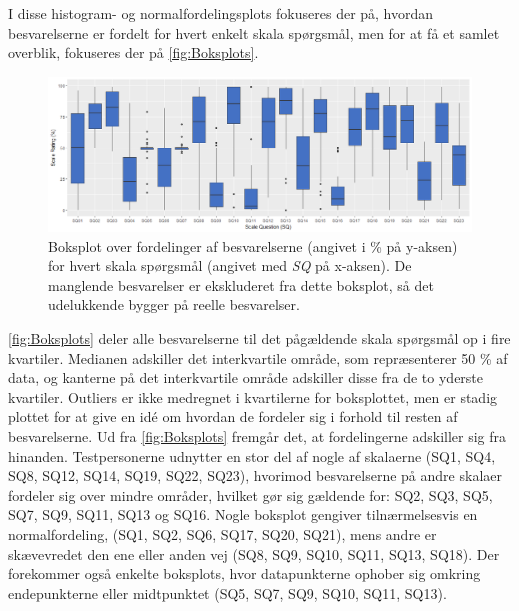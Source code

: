 \noindent
%
I disse histogram- og normalfordelingsplots fokuseres der på, hvordan besvarelserne er fordelt for hvert enkelt skala spørgsmål, men for at få et samlet overblik, fokuseres der på \autoref{fig:Boksplots}. 
%
\begin{figure}[H]
\centering
\includegraphics[width = \textwidth]{Figure/DatabehandlingSkalaer/BoksplotUden0er} 
\caption{Boksplot over fordelinger af besvarelserne (angivet i \% på y-aksen) for hvert skala spørgsmål (angivet med \textit{SQ} på x-aksen). De manglende besvarelser er ekskluderet fra dette boksplot, så det udelukkende bygger på reelle besvarelser.}
\label{fig:Boksplots}
\end{figure}
\noindent
%
\autoref{fig:Boksplots} deler alle besvarelserne til det pågældende skala spørgsmål op i fire kvartiler. Medianen adskiller det interkvartile område, som repræsenterer 50 \% af data, og kanterne på det interkvartile område adskiller disse fra de to yderste kvartiler. Outliers er ikke medregnet i kvartilerne for boksplottet, men er stadig plottet for at give en idé om hvordan de fordeler sig i forhold til resten af besvarelserne. \blankline
%
Ud fra \autoref{fig:Boksplots} fremgår det, at fordelingerne adskiller sig fra hinanden. Testpersonerne udnytter en stor del af nogle af skalaerne (SQ1, SQ4, SQ8, SQ12, SQ14, SQ19, SQ22, SQ23), hvorimod besvarelserne på andre skalaer fordeler sig over mindre områder, hvilket gør sig gældende for: SQ2, SQ3, SQ5, SQ7, SQ9, SQ11, SQ13 og SQ16. Nogle boksplot gengiver tilnærmelsesvis en normalfordeling, (SQ1, SQ2, SQ6, SQ17, SQ20, SQ21), mens andre er skævevredet den ene eller anden vej (SQ8, SQ9, SQ10, SQ11, SQ13, SQ18). Der forekommer også enkelte boksplots, hvor datapunkterne ophober sig omkring endepunkterne eller midtpunktet (SQ5, SQ7, SQ9, SQ10, SQ11, SQ13). \blankline
%
